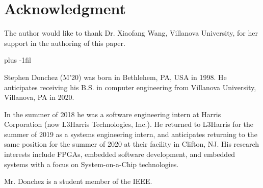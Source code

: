 \documentclass[journal]{IEEEtran}
\begin{document}
\section*{Acknowledgment}
The author would like to thank Dr. Xiaofang Wang, Villanova University, for her support in
the authoring of this paper.





\vskip 0pt plus -1fil
\begin{IEEEbiography}
	{Stephen Donchez}
(M'20) was born in Bethlehem, PA, USA in 1998. He anticipates receiving his B.S. in
computer engineering from Villanova University, Villanova, PA in 2020.

In the summer of 2018 he was a software engineering intern at Harris Corporation  
(now L3Harris Technologies, Inc.). He returned to L3Harris for the summer of 2019 as a 
systems engineering intern, and anticipates returning to the same position for the summer
of 2020 at their facility in Clifton, NJ. His research interests include FPGAs, embedded
software development, and embedded systems with a focus on System-on-a-Chip technologies.

Mr. Donchez is a student member of the IEEE.
\end{IEEEbiography}
\end{document}
